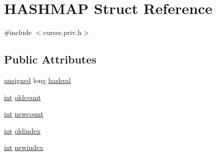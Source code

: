 \hypertarget{struct_h_a_s_h_m_a_p}{\section{H\-A\-S\-H\-M\-A\-P Struct Reference}
\label{struct_h_a_s_h_m_a_p}
}


{\ttfamily \#include $<$curses.\-priv.\-h$>$}

\subsection*{Public Attributes}
\begin{DoxyCompactItemize}
\item 
\hyperlink{curses_8priv_8h_aca40206900cfc164654362fa8d4ad1e6}{unsigned} long \hyperlink{struct_h_a_s_h_m_a_p_ab9ee7e28b92cd2bf5f168e32cb3eebc9}{hashval}
\item 
\hyperlink{term__entry_8h_ad65b480f8c8270356b45a9890f6499ae}{int} \hyperlink{struct_h_a_s_h_m_a_p_aa0e9e33b062ab8695d16d149a35ea34b}{oldcount}
\item 
\hyperlink{term__entry_8h_ad65b480f8c8270356b45a9890f6499ae}{int} \hyperlink{struct_h_a_s_h_m_a_p_a64f6ed4c0247f0ef1fde834067e5ef9b}{newcount}
\item 
\hyperlink{term__entry_8h_ad65b480f8c8270356b45a9890f6499ae}{int} \hyperlink{struct_h_a_s_h_m_a_p_ac469027596988cc84fd824707a28daf3}{oldindex}
\item 
\hyperlink{term__entry_8h_ad65b480f8c8270356b45a9890f6499ae}{int} \hyperlink{struct_h_a_s_h_m_a_p_ad659cf55495a6eae254925d04604c4f2}{newindex}
\end{DoxyCompactItemize}


